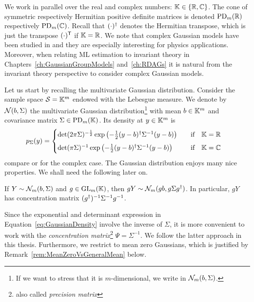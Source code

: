 We work in parallel over the real and complex numbers: $\mathbb K \in \{\mathbb R, \mathbb C\}$. The cone of symmetric respectively Hermitian positive definite matrices is denoted $\operatorname{PD}_m(\mathbb R)$ respectively $\operatorname{PD}_m(\mathbb C)$. Recall that $(\cdot)^{\dagger}$ denotes the Hermitian transpose, which is just the transpose $(\cdot)^{\mathsf{T}}$ if $\mathbb K = \mathbb R$.
We note that complex Gaussian models have been studied in \cite{ComplexGraphicalModelsBook, goodman1963complexGaussian} and they are especially interesting for physics applications. Moreover, when relating ML estimation to invariant theory in Chapters~\ref{ch:GaussianGroupModels} and~\ref{ch:RDAGs} it is natural from the invariant theory perspective to consider complex Gaussian models.

\bigskip

Let us start by recalling the multivariate Gaussian distribution.
Consider the sample space $\mathcal{S} = \mathbb K^m$ endowed with the Lebesgue measure. We denote by $\mathcal{N}(b,\Sigma)$ the multivariate Gaussian distribution\footnote{If we want to stress that it is $m$-dimensional, we write in $\mathcal{N}_m(b,\Sigma)$.} with mean $b \in \mathbb K^m$ and covariance matrix $\Sigma \in \operatorname{PD}_m(\mathbb K)$. Its density at $y \in \mathbb K^m$ is
\begin{equation}\label{eq:GaussianDensity}
	\begin{split}
	p_{\Sigma}(y) &= \begin{cases}
		\det(2\pi \Sigma)^{-\frac{1}{2}} \exp \left( -\frac{1}{2} (y-b)^{\dagger} \Sigma^{-1} (y-b) \right) & \quad\text{if} \quad \mathbb K = \mathbb R\\[5pt]
		\det(\pi \Sigma)^{-1} \exp \left( -\frac{1}{2} (y-b)^{\dagger} \Sigma^{-1} (y-b) \right) & \quad\text{if} \quad \mathbb K = \mathbb C\\
	\end{cases}	
	\end{split}
\end{equation}
compare \cite{wooding1956multivariate} or \cite[Theorem~3.1]{goodman1963complexGaussian} for the complex case. The Gaussian distribution enjoys many nice properties. We shall need the following later on.

\begin{lemma}\label{lem:AffineLinearTransformationOfGaussian}
	If $Y \sim \mathcal{N}_m(b,\Sigma)$ and $g \in \operatorname{GL}_m(\mathbb K)$, then $gY \sim \mathcal{N}_m(g b, g \Sigma g^{\dagger})$. In particular, $gY$ has concentration matrix $(g^{\dagger})^{-1} \Sigma^{-1} g^{-1}$.
\end{lemma}

Since the exponential and determinant expression in Equation~\eqref{eq:GaussianDensity} involve the inverse of $\Sigma$, it is more convenient to work with the \emph{concentration matrix}\footnote{also called \emph{precision matrix}} $\Psi = \Sigma^{-1}$. We follow the latter approach in this thesis. Furthermore, we restrict to mean zero Gaussians, which is justified by Remark~\ref{rem:MeanZeroVsGeneralMean} below.

